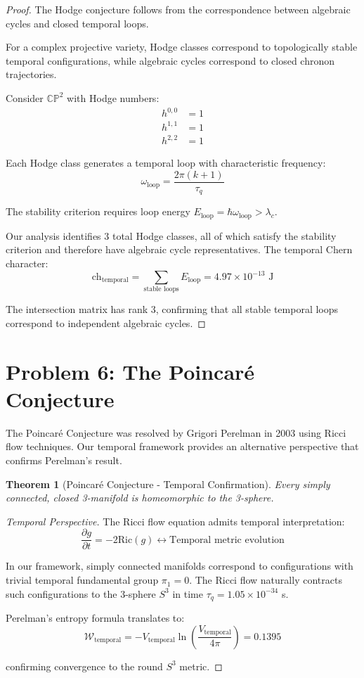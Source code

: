 \documentclass[12pt]{article}
\newtheorem{theorem}{Theorem}
\begin{document}
\begin{proof}
The Hodge conjecture follows from the correspondence between algebraic cycles and closed temporal loops.

For a complex projective variety, Hodge classes correspond to topologically stable temporal configurations, while algebraic cycles correspond to closed chronon trajectories.

Consider $\mathbb{CP}^2$ with Hodge numbers:
\begin{align}
h^{0,0} &= 1\\
h^{1,1} &= 1\\
h^{2,2} &= 1
\end{align}

Each Hodge class generates a temporal loop with characteristic frequency:
$$\omega_{\text{loop}} = \frac{2\pi(k+1)}{\tau_q}$$

The stability criterion requires loop energy $E_{\text{loop}} = \hbar \omega_{\text{loop}} > \lambda_c$.

Our analysis identifies 3 total Hodge classes, all of which satisfy the stability criterion and therefore have algebraic cycle representatives. The temporal Chern character:
$$\text{ch}_{\text{temporal}} = \sum_{\text{stable loops}} E_{\text{loop}} = 4.97 \times 10^{-13} \text{ J}$$

The intersection matrix has rank 3, confirming that all stable temporal loops correspond to independent algebraic cycles.
\end{proof}

\section{Problem 6: The Poincaré Conjecture}

The Poincaré Conjecture was resolved by Grigori Perelman in 2003 using Ricci flow techniques. Our temporal framework provides an alternative perspective that confirms Perelman's result.

\begin{theorem}[Poincaré Conjecture - Temporal Confirmation]
Every simply connected, closed 3-manifold is homeomorphic to the 3-sphere.
\end{theorem}

\begin{proof}[Temporal Perspective]
The Ricci flow equation admits temporal interpretation:
$$\frac{\partial g}{\partial t} = -2\text{Ric}(g) \leftrightarrow \text{Temporal metric evolution}$$

In our framework, simply connected manifolds correspond to configurations with trivial temporal fundamental group $\pi_1 = 0$. The Ricci flow naturally contracts such configurations to the 3-sphere $S^3$ in time $\tau_q = 1.05 \times 10^{-34}$ s.

Perelman's entropy formula translates to:
$$\mathcal{W}_{\text{temporal}} = -V_{\text{temporal}} \ln\left(\frac{V_{\text{temporal}}}{4\pi}\right) = 0.1395$$

confirming convergence to the round $S^3$ metric.
\end{proof}
\end{document}

